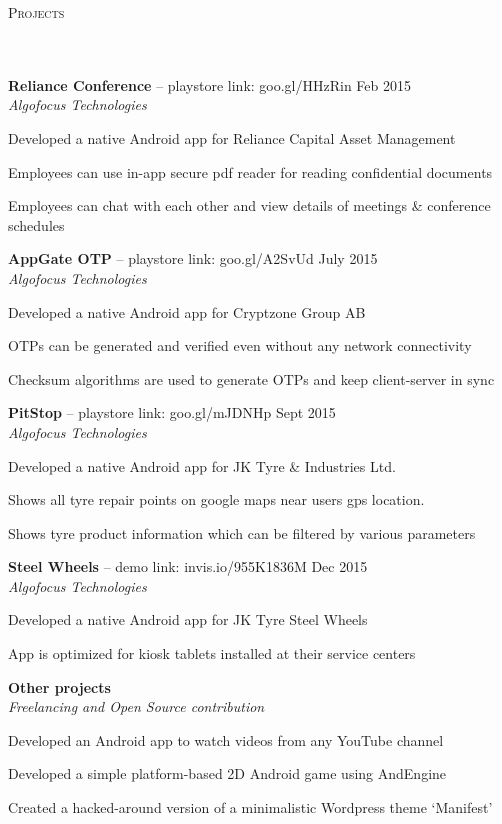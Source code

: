 \documentclass{article}
\newcommand{\header}[1]{{
\hspace*{-15pt}\vspace*{6pt} \textsc{#1}} \vspace*{-6pt} 
\lineunder
}
\newcommand{\lineunder}{
\vspace*{-8pt} \\ \hspace*{-18pt} 
\hrulefill \\
}
\newcommand{\project}[4]{{
\vspace*{2pt}%
\textbf{#1} #2 \hfill #3\\ \textit{#4} \vspace*{2pt}}
}
\renewcommand{\labelitemii}{
$\vcenter{\hbox{\tiny$\bullet$}}$\hspace*{-3pt}
}
\newenvironment{bullet-list-minor}{
\begin{list}{\labelitemii}{\setlength\leftmargin{15pt} 
\topsep 0pt \itemsep -2pt}}{\vspace*{4pt}\end{list}
}
\begin{document}
\newpage
\vspace*{-20pt}
\header{Projects}
    \project{Reliance Conference}{-- playstore link: goo.gl/HHzRin}{Feb 2015}{Algofocus Technologies}
	\begin{bullet-list-minor}
	\item Developed a native Android app for Reliance Capital Asset Management
    \item Employees can use in-app secure pdf reader for reading confidential documents
    \item Employees can chat with each other and view details of meetings \& conference schedules
    \end{bullet-list-minor}

    \project{AppGate OTP}{-- playstore link: goo.gl/A2SvUd}{July 2015}{Algofocus Technologies}
	\begin{bullet-list-minor}
	\item Developed a native Android app for Cryptzone Group AB
	\item OTPs can be generated and verified even without any network connectivity
    \item Checksum algorithms are used to generate OTPs and keep client-server in sync
    \end{bullet-list-minor}

    \project{PitStop}{-- playstore link: goo.gl/mJDNHp}{Sept 2015}{Algofocus Technologies}
	\begin{bullet-list-minor}
	\item Developed a native Android app for JK Tyre \& Industries Ltd.
	\item Shows all tyre repair points on google maps near users gps location.
	\item Shows tyre product information which can be filtered by various parameters 
	\end{bullet-list-minor}

    \project{Steel Wheels}{-- demo link: invis.io/955K1836M}{Dec 2015}{Algofocus Technologies}
	\begin{bullet-list-minor}
    \item Developed a native Android app for JK Tyre Steel Wheels
    \item App is optimized for kiosk tablets installed at their service centers
	\end{bullet-list-minor}
	
    \project{Other projects}{}{}{Freelancing and Open Source contribution}
	\begin{bullet-list-minor}
	\item Developed an Android app to watch videos from any YouTube channel
	\vspace{2pt}
    \item Developed a simple platform-based 2D Android game using AndEngine
	\vspace{2pt}
    \item Created a hacked-around version of a minimalistic Wordpress theme `Manifest'
	\end{bullet-list-minor}
	
\end{document}
